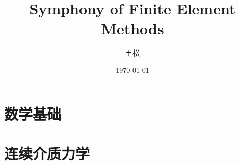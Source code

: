 \documentclass[lang=cn,newtx,10pt,scheme=chinese]{elegantbook}
\title{Symphony of Finite Element Methods}
\author{王松}
\date{\today}
\begin{document}
\maketitle
\frontmatter

\tableofcontents

\mainmatter

\part{数学基础}

\part{连续介质力学}
\end{document}
